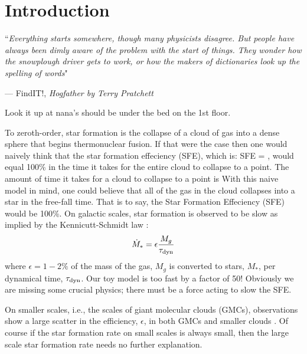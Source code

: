 \documentclass[../dissertation.tex]{subfiles}
\begin{document}
\chapter{Introduction}

\singlespace
\epigraph{``\emph{Everything starts somewhere, though many physicists disagree. But people have always been dimly aware of the problem with the start of things. They wonder how the snowplough driver gets to work, or how the makers of dictionaries look up the spelling of words}"}{--- \textup{FindIT!}, \textit{Hogfather by Terry Pratchett}}

Look it up at nana's should be under the bed on the 1st floor.
\dblspace

To zeroth-order, star formation is the collapse of a cloud of gas into a dense sphere that begins thermonuclear fusion.%
If that were the case then one would naively think that the star formation effeciency (SFE), which is:
%
\be
{\rm SFE} = , 
\ee
%
would equal 100\% in the time it takes for the entire cloud to collapse to a point.
The amount of time it takes for a cloud to collapse to a point is 
With this naive model in mind, one could believe that all of the gas in the cloud collapses into a star in the free-fall time.
That is to say, the Star Formation Effeciency (SFE) would be 100\%.
On galactic scales, star formation is observed to be slow as implied by the Kennicutt-Schmidt law \citep{1998ApJ...498..541K,2008AJ....136.2782L}:
\begin{equation}\label{eq:kennicutt}
 \dot{M}_* = \epsilon \frac{M_g}{\tau_{\rm dyn}}
\end{equation}
where $\epsilon = 1-2\%$ of the mass of the gas, $M_g$ is converted to stars, $M_*$, per dynamical time, $\tau_{\rm dyn}$. 
Our toy model is too fast by a factor of 50! 
Obviously we are missing some crucial physics; there must be a force acting to slow the SFE.

On smaller scales, i.e., the scales of giant molecular clouds (GMCs), observations show a large scatter in the efficiency, $\epsilon$, in both GMCs \citep{2016ApJ...833..229L} and smaller clouds \citep{2014ApJ...782..114E}. 
Of course if the star formation rate on small scales is always small, then the large scale star formation rate needs no further explanation.
\end{document}
